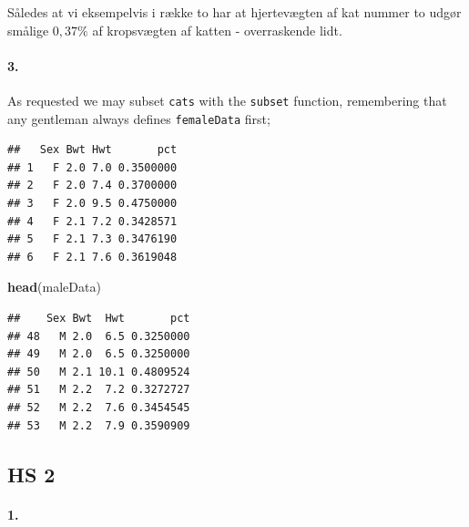 \documentclass[
]{article}
\newenvironment{Shaded}{\begin{snugshade}}{\end{snugshade}}
\newcommand{\KeywordTok}[1]{\textcolor[rgb]{0.13,0.29,0.53}{\textbf{#1}}}
\newcommand{\NormalTok}[1]{#1}
\newcommand{\OperatorTok}[1]{\textcolor[rgb]{0.81,0.36,0.00}{\textbf{#1}}}
\newcommand{\StringTok}[1]{\textcolor[rgb]{0.31,0.60,0.02}{#1}}
\begin{document}
Således at vi eksempelvis i række to har at hjertevægten af kat nummer
to udgør smålige \(0,37\%\) af kropsvægten af katten - overraskende
lidt.

\hypertarget{section-2}{%
\paragraph{\texorpdfstring{\textbf{3.}}{3.}}\label{section-2}}

As requested we may subset \texttt{cats} with the \texttt{subset}
function, remembering that any gentleman always defines
\texttt{femaleData} first;

\begin{Shaded}
\end{Shaded}

\begin{verbatim}
##   Sex Bwt Hwt       pct
## 1   F 2.0 7.0 0.3500000
## 2   F 2.0 7.4 0.3700000
## 3   F 2.0 9.5 0.4750000
## 4   F 2.1 7.2 0.3428571
## 5   F 2.1 7.3 0.3476190
## 6   F 2.1 7.6 0.3619048
\end{verbatim}

\begin{Shaded}
\begin{Highlighting}[]
\KeywordTok{head}\NormalTok{(maleData)}
\end{Highlighting}
\end{Shaded}

\begin{verbatim}
##    Sex Bwt  Hwt       pct
## 48   M 2.0  6.5 0.3250000
## 49   M 2.0  6.5 0.3250000
## 50   M 2.1 10.1 0.4809524
## 51   M 2.2  7.2 0.3272727
## 52   M 2.2  7.6 0.3454545
## 53   M 2.2  7.9 0.3590909
\end{verbatim}

\hypertarget{hs-2}{%
\subsection{HS 2}\label{hs-2}}

\hypertarget{section-3}{%
\paragraph{\texorpdfstring{\textbf{1.}}{1.}}\label{section-3}}
\end{document}
